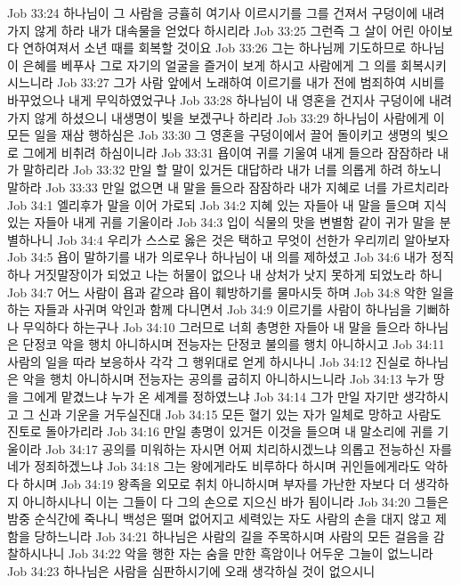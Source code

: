 Job 33:24  하나님이 그 사람을 긍휼히 여기사 이르시기를 그를 건져서 구덩이에 내려가지 않게 하라 내가 대속물을 얻었다 하시리라
Job 33:25  그런즉 그 살이 어린 아이보다 연하여져서 소년 때를 회복할 것이요
Job 33:26  그는 하나님께 기도하므로 하나님이 은혜를 베푸사 그로 자기의 얼굴을 즐거이 보게 하시고 사람에게 그 의를 회복시키시느니라
Job 33:27  그가 사람 앞에서 노래하여 이르기를 내가 전에 범죄하여 시비를 바꾸었으나 내게 무익하였었구나
Job 33:28  하나님이 내 영혼을 건지사 구덩이에 내려가지 않게 하셨으니 내생명이 빛을 보겠구나 하리라
Job 33:29  하나님이 사람에게 이 모든 일을 재삼 행하심은
Job 33:30  그 영혼을 구덩이에서 끌어 돌이키고 생명의 빛으로 그에게 비취려 하심이니라
Job 33:31  욥이여 귀를 기울여 내게 들으라 잠잠하라 내가 말하리라
Job 33:32  만일 할 말이 있거든 대답하라 내가 너를 의롭게 하려 하노니 말하라
Job 33:33  만일 없으면 내 말을 들으라 잠잠하라 내가 지혜로 너를 가르치리라
Job 34:1  엘리후가 말을 이어 가로되
Job 34:2  지혜 있는 자들아 내 말을 들으며 지식 있는 자들아 내게 귀를 기울이라
Job 34:3  입이 식물의 맛을 변별함 같이 귀가 말을 분별하나니
Job 34:4  우리가 스스로 옳은 것은 택하고 무엇이 선한가 우리끼리 알아보자
Job 34:5  욥이 말하기를 내가 의로우나 하나님이 내 의를 제하셨고
Job 34:6  내가 정직하나 거짓말장이가 되었고 나는 허물이 없으나 내 상처가 낫지 못하게 되었노라 하니
Job 34:7  어느 사람이 욥과 같으랴 욥이 훼방하기를 물마시듯 하며
Job 34:8  악한 일을 하는 자들과 사귀며 악인과 함께 다니면서
Job 34:9  이르기를 사람이 하나님을 기뻐하나 무익하다 하는구나
Job 34:10  그러므로 너희 총명한 자들아 내 말을 들으라 하나님은 단정코 악을 행치 아니하시며 전능자는 단정코 불의를 행치 아니하시고
Job 34:11  사람의 일을 따라 보응하사 각각 그 행위대로 얻게 하시나니
Job 34:12  진실로 하나님은 악을 행치 아니하시며 전능자는 공의를 굽히지 아니하시느니라
Job 34:13  누가 땅을 그에게 맡겼느냐 누가 온 세계를 정하였느냐
Job 34:14  그가 만일 자기만 생각하시고 그 신과 기운을 거두실진대
Job 34:15  모든 혈기 있는 자가 일체로 망하고 사람도 진토로 돌아가리라
Job 34:16  만일 총명이 있거든 이것을 들으며 내 말소리에 귀를 기울이라
Job 34:17  공의를 미워하는 자시면 어찌 치리하시겠느냐 의롭고 전능하신 자를 네가 정죄하겠느냐
Job 34:18  그는 왕에게라도 비루하다 하시며 귀인들에게라도 악하다 하시며
Job 34:19  왕족을 외모로 취치 아니하시며 부자를 가난한 자보다 더 생각하지 아니하시나니 이는 그들이 다 그의 손으로 지으신 바가 됨이니라
Job 34:20  그들은 밤중 순식간에 죽나니 백성은 떨며 없어지고 세력있는 자도 사람의 손을 대지 않고 제함을 당하느니라
Job 34:21  하나님은 사람의 길을 주목하시며 사람의 모든 걸음을 감찰하시나니
Job 34:22  악을 행한 자는 숨을 만한 흑암이나 어두운 그늘이 없느니라
Job 34:23  하나님은 사람을 심판하시기에 오래 생각하실 것이 없으시니
